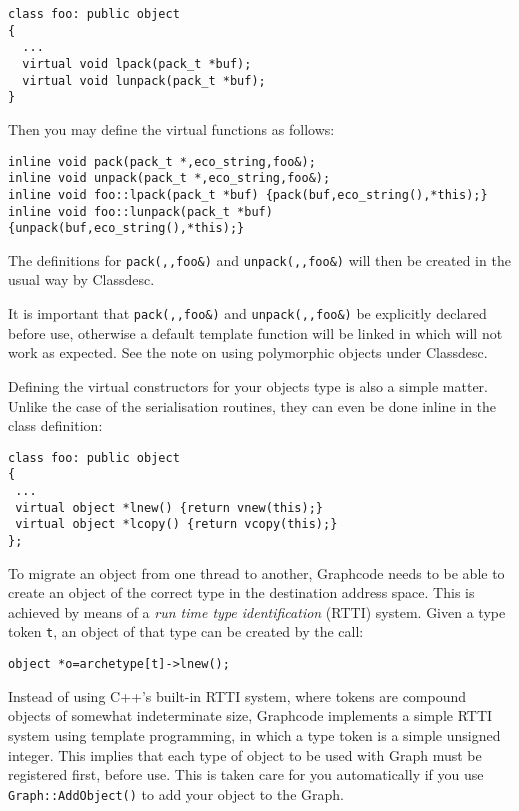 \begin{verbatim}
class foo: public object
{
  ...
  virtual void lpack(pack_t *buf);
  virtual void lunpack(pack_t *buf);
}
\end{verbatim}

Then you may define the virtual functions as follows:
\begin{verbatim}
inline void pack(pack_t *,eco_string,foo&);
inline void unpack(pack_t *,eco_string,foo&);
inline void foo::lpack(pack_t *buf) {pack(buf,eco_string(),*this);}
inline void foo::lunpack(pack_t *buf) {unpack(buf,eco_string(),*this);}
\end{verbatim}

The definitions for \verb+pack(,,foo&)+ and \verb+unpack(,,foo&)+ will
then be created in the usual way by Classdesc.

It is important that \verb+pack(,,foo&)+ and \verb+unpack(,,foo&)+ be explicitly
declared before use, otherwise a default template function will be
linked in which will not work as expected. See the note on using
polymorphic objects under Classdesc.


Defining the virtual constructors for your objects type is also a
simple matter. Unlike the case of the serialisation routines, they can
even be done inline in the class definition:
\begin{verbatim}
class foo: public object
{
 ...
 virtual object *lnew() {return vnew(this);}
 virtual object *lcopy() {return vcopy(this);}
};
\end{verbatim}


To migrate an object from one thread to another, Graphcode needs to be
able to create an object of the correct type in the destination
address space. This is achieved by means of a {\em run time type
  identification} (RTTI) system. Given a type token
\verb+t+, an object of that type can be created by the call:
\begin{verbatim}
object *o=archetype[t]->lnew();
\end{verbatim}

Instead of using C++'s built-in RTTI system, where tokens are compound
objects of somewhat indeterminate size, Graphcode implements a simple
RTTI system using template programming, in which a type token is a
simple unsigned integer. This implies that each type of object
to be used with Graph must be registered first, before use. This is
taken care for you automatically if you use \verb+Graph::AddObject()+ to
add your object to the Graph.

